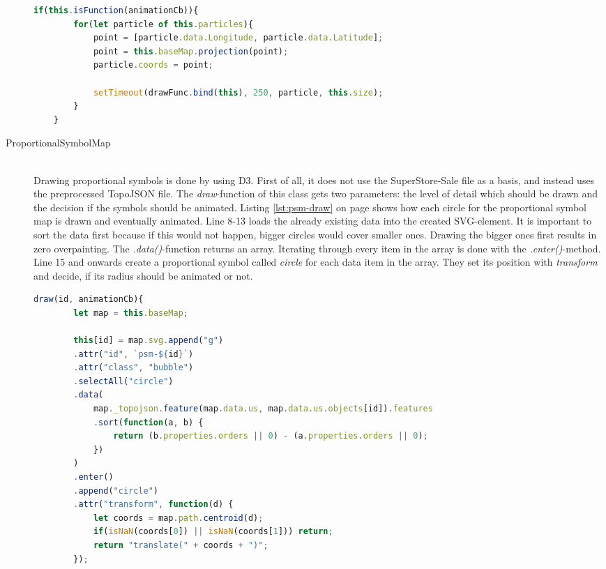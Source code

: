 \begin{description}
\begin{lstlisting}[language=JavaScript, caption={Particles on a dot map getting animated.}, label={lst:dot-draw-animated}]
    if(this.isFunction(animationCb)){
        for(let particle of this.particles){
            point = [particle.data.Longitude, particle.data.Latitude];
            point = this.baseMap.projection(point);
            particle.coords = point;

            setTimeout(drawFunc.bind(this), 250, particle, this.size);
        }
    }
\end{lstlisting}

\item[ProportionalSymbolMap] \hfill \\
Drawing proportional symbols is done by using \ac{D3}. First of all, it does not use the SuperStore-Sale file as a basis, and instead uses the preprocessed TopoJSON file. The \textit{draw}-function of this class gets two parameters: the level of detail which should be drawn and the decision if the symbols should be animated. Listing \ref{lst:psm-draw} on page \pageref{lst:psm-draw} shows how each circle for the proportional symbol map is drawn and eventually animated. Line 8-13 loads the already existing data into the created \ac{SVG}-element. It is important to sort the data first because if this would not happen, bigger circles would cover smaller ones. Drawing the bigger ones first results in zero overpainting. The \textit{.data()}-function returns an array. Iterating through every item in the array is done with the \textit{.enter()}-method. Line 15 and onwards create a proportional symbol called \textit{circle} for each data item in the array. They set its position with \textit{transform} and decide, if its radius should be animated or not.

\begin{lstlisting}[language=JavaScript, caption={The draw-function of the ProportionalSymbolMap-class}, label={lst:psm-draw}]
    draw(id, animationCb){
        let map = this.baseMap;

        this[id] = map.svg.append("g")
        .attr("id", `psm-${id}`)
        .attr("class", "bubble")
        .selectAll("circle")
        .data(
            map._topojson.feature(map.data.us, map.data.us.objects[id]).features
            .sort(function(a, b) {
                return (b.properties.orders || 0) - (a.properties.orders || 0);
            })
        )
        .enter()
        .append("circle")
        .attr("transform", function(d) {
            let coords = map.path.centroid(d);
            if(isNaN(coords[0]) || isNaN(coords[1])) return;
            return "translate(" + coords + ")";
        });


\end{lstlisting}
\end{description}

